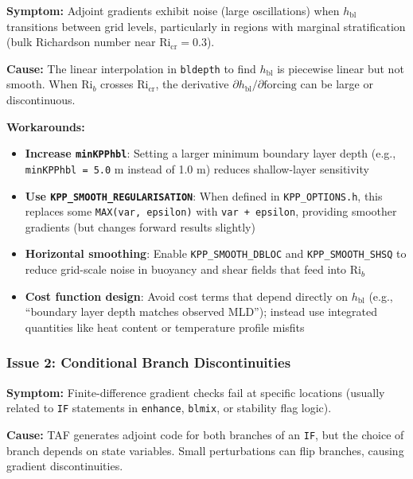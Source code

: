 \documentclass[12pt,letterpaper]{article}
\begin{document}
\textbf{Symptom:} Adjoint gradients exhibit noise (large oscillations) when
$h_{\text{bl}}$ transitions between grid levels, particularly in regions with
marginal stratification (bulk Richardson number near $\text{Ri}_{\text{cr}} = 0.3$).

\textbf{Cause:} The linear interpolation in \texttt{bldepth} to find
$h_{\text{bl}}$ is piecewise linear but not smooth. When $\text{Ri}_b$ crosses
$\text{Ri}_{\text{cr}}$, the derivative $\partial h_{\text{bl}} / \partial
\text{forcing}$ can be large or discontinuous.

\textbf{Workarounds:}
\begin{itemize}[leftmargin=*]
  \item \textbf{Increase \texttt{minKPPhbl}}: Setting a larger minimum boundary
        layer depth (e.g., \texttt{minKPPhbl = 5.0} m instead of 1.0 m) reduces
        shallow-layer sensitivity
  \item \textbf{Use \texttt{KPP\_SMOOTH\_REGULARISATION}}: When defined in
        \texttt{KPP\_OPTIONS.h}, this replaces some \texttt{MAX(var, epsilon)} with
        \texttt{var + epsilon}, providing smoother gradients (but changes forward
        results slightly)
  \item \textbf{Horizontal smoothing}: Enable \texttt{KPP\_SMOOTH\_DBLOC} and
        \texttt{KPP\_SMOOTH\_SHSQ} to reduce grid-scale noise in buoyancy and shear
        fields that feed into $\text{Ri}_b$
  \item \textbf{Cost function design}: Avoid cost terms that depend directly on
        $h_{\text{bl}}$ (e.g., ``boundary layer depth matches observed MLD''); instead
        use integrated quantities like heat content or temperature profile misfits
\end{itemize}

\subsubsection{Issue 2: Conditional Branch Discontinuities}

\textbf{Symptom:} Finite-difference gradient checks fail at specific locations
(usually related to \texttt{IF} statements in \texttt{enhance}, \texttt{blmix},
or stability flag logic).

\textbf{Cause:} TAF generates adjoint code for both branches of an \texttt{IF},
but the choice of branch depends on state variables. Small perturbations can
flip branches, causing gradient discontinuities.
\end{document}
